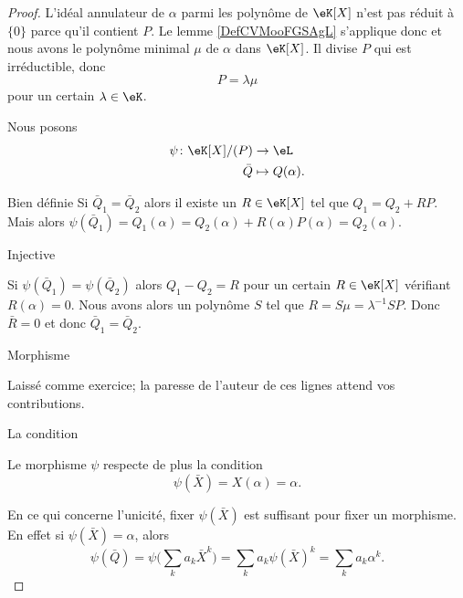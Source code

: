 \begin{proof}
    L'idéal annulateur de \( \alpha\) parmi les polynôme de \( \eK[X]\) n'est pas réduit à \( \{ 0 \}\) parce qu'il contient \( P\). Le lemme \ref{DefCVMooFGSAgL} s'applique donc et nous avons le polynôme minimal \( \mu\) de \( \alpha\) dans \( \eK[X]\). Il divise \( P\) qui est irréductible, donc
    \begin{equation}
        P=\lambda \mu
    \end{equation}
    pour un certain \( \lambda\in \eK\).

    Nous posons
    \begin{equation}
        \begin{aligned}
            \psi\colon \eK[X]/(P)&\to \eL \\
            \bar Q&\mapsto Q(\alpha). 
        \end{aligned}
    \end{equation}
    \begin{subproof}
        \item[Bien définie]
            Si \( \bar Q_1=\bar Q_2\) alors il existe un \( R\in \eK[X]\) tel que \( Q_1=Q_2+RP\). Mais alors \( \psi(\bar Q_1)=Q_1(\alpha)=Q_2(\alpha)+R(\alpha)P(\alpha)=Q_2(\alpha)\).
        \item[Injective]

            Si \( \psi(\bar Q_1)=\psi(\bar Q_2)\) alors \( Q_1-Q_2=R\) pour un certain \( R\in \eK[X]\) vérifiant \( R(\alpha)=0\). Nous avons alors un polynôme \( S\) tel que \( R=S\mu=\lambda^{-1}SP\). Donc \( \bar R=0\) et donc \( \bar Q_1=\bar Q_2\).

        \item[Morphisme]

            Laissé comme exercice; la paresse de l'auteur de ces lignes attend vos contributions.

        \item[La condition]

            Le morphisme \( \psi\) respecte de plus la condition
            \begin{equation}
                \psi(\bar X)=X(\alpha)=\alpha.
            \end{equation}

    \end{subproof}

    En ce qui concerne l'unicité, fixer \( \psi(\bar X)\) est suffisant pour fixer un morphisme. En effet si \( \psi(\bar X)=\alpha\), alors
    \begin{equation}
        \psi(\bar Q)=\psi\Big( \sum_ka_k\bar X^k \Big)=\sum_ka_k\psi(\bar X)^k=\sum_ka_k\alpha^k.
    \end{equation}
    

\end{proof}
